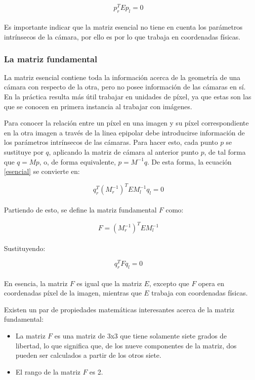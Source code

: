\begin{equation}
  p_{r}^TEp_{l} = 0
  \label{esencial}
\end{equation}\\
Es importante indicar que la matriz esencial no tiene en cuenta los parámetros intrínsecos de la cámara, por ello es por lo que trabaja en coordenadas físicas.

\subsubsection{La matriz fundamental}

La matriz esencial contiene toda la información acerca de la geometría de una cámara con respecto de la otra, pero no posee información de las cámaras en sí. En la práctica resulta más útil trabajar en unidades de píxel, ya que estas son las que se conocen en primera instancia al trabajar con imágenes.

Para conocer la relación entre un píxel en una imagen y su píxel correspondiente en la otra imagen a través de la linea epipolar debe introducirse información de los parámetros intrínsecos de las cámaras. Para hacer esto, cada punto $p$ se sustituye por $q$, aplicando la matriz de cámara al anterior punto $p$, de tal forma que $q=Mp$, o, de forma equivalente, $p=M^{-1}q$. De esta forma, la ecuación \ref{esencial} se convierte en:

\begin{equation*}
  q_r^T(M_r^{-1})^TEM_l^{-1}q_l=0
\end{equation*}\\
Partiendo de esto, se define la matriz fundamental $F$ como:

\begin{equation}
  F=(M_r^{-1})^TEM_l^{-1}
  \label{defFundamental}
\end{equation}\\
Sustituyendo:

\begin{equation}
  q_r^TFq_l=0
  \label{fundamental}
\end{equation}\\
En esencia, la matriz $F$ es igual que la matriz $E$, excepto que $F$ opera en coordenadas píxel de la imagen, mientras que $E$ trabaja con coordenadas físicas.

Existen un par de propiedades matemáticas interesantes acerca de la matriz fundamental:

\begin{itemize}
\item La matriz $F$ es una matriz de 3x3 que tiene solamente siete grados de libertad, lo que significa que, de los nueve componentes de la matriz, dos pueden ser calculados a partir de los otros siete.
\item El rango de la matriz $F$ es 2.
\end{itemize}

